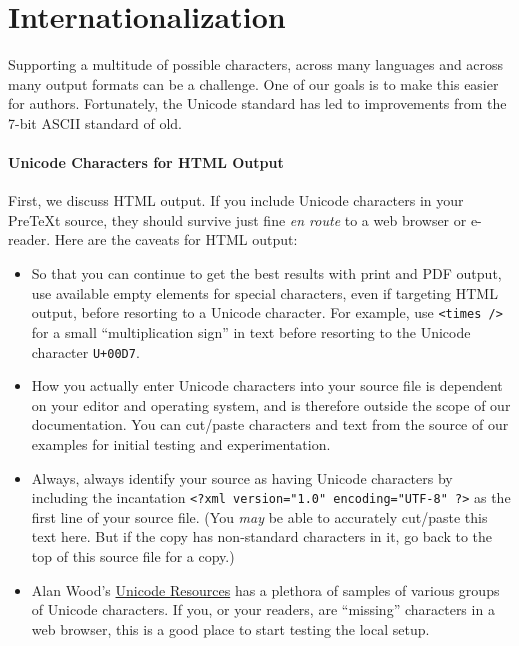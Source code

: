 \documentclass[10pt,]{article}
\theoremstyle{plain}
\theoremstyle{definition}
\theoremstyle{definition}
\theoremstyle{definition}
\theoremstyle{definition}
\theoremstyle{definition}
\theoremstyle{definition}
\numberwithin{equation}{section}
\begin{document}
\typeout{************************************************}
\typeout{************************************************}
\section[{Internationalization}]{Internationalization}\label{section-internationalization}
\hypertarget{p-592}{}%
Supporting a multitude of possible characters, across many languages and across many output formats can be a challenge.  One of our goals is to make this easier for authors.  Fortunately, the Unicode standard has led to improvements from the 7-bit ASCII standard of old.%
\typeout{************************************************}
\typeout{************************************************}
\paragraph[{Unicode Characters for HTML Output}]{Unicode Characters for HTML Output}\hypertarget{paragraphs-5}{}
\hypertarget{p-593}{}%
First, we discuss HTML output.  If you include Unicode characters in your PreTeXt source, they should survive just fine \textit{en route} to a web browser or e-reader.  Here are the caveats for HTML output:\leavevmode%
\begin{itemize}[label=\textbullet]
\item{}\hypertarget{p-594}{}%
So that you can continue to get the best results with print and PDF output, use available empty elements for special characters, even if targeting HTML output, before resorting to a Unicode character.  For example, use \lstinline?<times />? for a small ``multiplication sign'' in text before resorting to the Unicode character \lstinline?U+00D7?.%
\item{}\hypertarget{p-595}{}%
How you actually enter Unicode characters into your source file is dependent on your editor and operating system, and is therefore outside the scope of our documentation.  You can cut/paste characters and text from the source of our examples for initial testing and experimentation.%
\item{}\hypertarget{p-596}{}%
Always, always identify your source as having Unicode characters by including the incantation \lstinline!<?xml version="1.0" encoding="UTF-8" ?>! as the first line of your source file. (You \emph{may} be able to accurately cut/paste this text here.  But if the copy has non-standard characters in it, go back to the top of this source file for a copy.)%
\item{}\hypertarget{p-597}{}%
Alan Wood’s \href{http://www.alanwood.net/unicode/unicode_samples.html}{Unicode Resources} has a plethora of samples of various groups of Unicode characters.  If you, or your readers, are ``missing'' characters in a web browser, this is a good place to start testing the local setup.%
\end{itemize}
%
\typeout{************************************************}
\typeout{************************************************}
\end{document}
